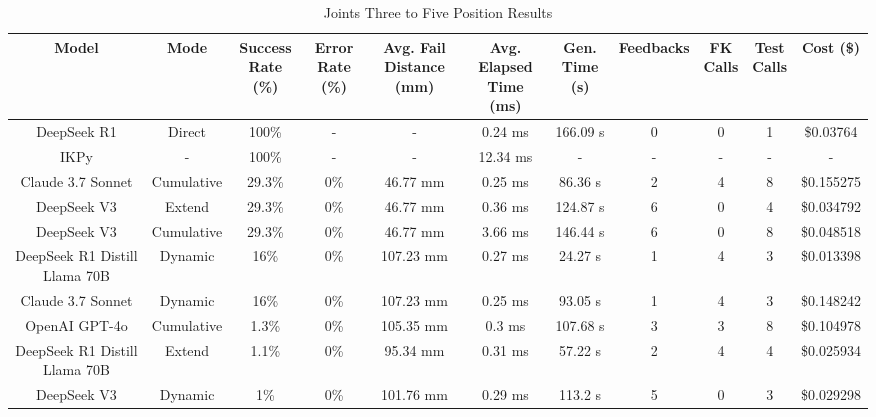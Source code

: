 \begin{landscape}
\begin{table}[H]
\tiny
\renewcommand{\arraystretch}{1.2}
\caption{Joints Three to Five Position Results}
\begin{center}
\begin{tabular}{|c|c|c|c|c|c|c|c|c|c|c|}
    \hline
    \textbf{Model} & 
    \textbf{Mode} & 
    \makecell{\textbf{Success}\\\textbf{Rate (\%)}} &
    \makecell{\textbf{Error}\\\textbf{Rate (\%)}} &
    \makecell{\textbf{Avg. Fail}\\\textbf{Distance (mm)}} &
    \makecell{\textbf{Avg. Elapsed}\\\textbf{Time (ms)}} &
    \makecell{\textbf{Gen.}\\\textbf{Time (s)}} &
    \textbf{Feedbacks} &
    \makecell{\textbf{FK}\\\textbf{Calls}} &
    \makecell{\textbf{Test}\\\textbf{Calls}} &
    \textbf{Cost (\$)} \\
    \hline
    DeepSeek R1 & Direct & 100\% & - & - & 0.24 ms & 166.09 s & 0 & 0 & 1 & \$0.03764 \\
    \hline
    IKPy & - & 100\% & - & - & 12.34 ms & - & - & - & - & - \\
    \hline
    Claude 3.7 Sonnet & Cumulative & 29.3\% & 0\% & 46.77 mm & 0.25 ms & 86.36 s & 2 & 4 & 8 & \$0.155275 \\
    \hline
    DeepSeek V3 & Extend & 29.3\% & 0\% & 46.77 mm & 0.36 ms & 124.87 s & 6 & 0 & 4 & \$0.034792 \\
    \hline
    DeepSeek V3 & Cumulative & 29.3\% & 0\% & 46.77 mm & 3.66 ms & 146.44 s & 6 & 0 & 8 & \$0.048518 \\
    \hline
    DeepSeek R1 Distill Llama 70B & Dynamic & 16\% & 0\% & 107.23 mm & 0.27 ms & 24.27 s & 1 & 4 & 3 & \$0.013398 \\
    \hline
    Claude 3.7 Sonnet & Dynamic & 16\% & 0\% & 107.23 mm & 0.25 ms & 93.05 s & 1 & 4 & 3 & \$0.148242 \\
    \hline
    OpenAI GPT-4o & Cumulative & 1.3\% & 0\% & 105.35 mm & 0.3 ms & 107.68 s & 3 & 3 & 8 & \$0.104978 \\
    \hline
    DeepSeek R1 Distill Llama 70B & Extend & 1.1\% & 0\% & 95.34 mm & 0.31 ms & 57.22 s & 2 & 4 & 4 & \$0.025934 \\
    \hline
    DeepSeek V3 & Dynamic & 1\% & 0\% & 101.76 mm & 0.29 ms & 113.2 s & 5 & 0 & 3 & \$0.029298 \\
    \hline

\end{tabular}
\end{center}
\end{table}
\end{landscape}
